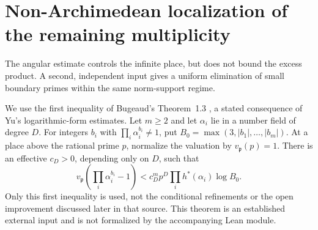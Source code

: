 \section{Non-Archimedean localization of the remaining multiplicity}
\label{sec:adic-moving}
The angular estimate controls the infinite place, but does not bound the excess product. A second, independent input gives a uniform elimination of small boundary primes within the same norm-support regime.

We use the first inequality of Bugeaud's Theorem~1.3 \cite{bugeaud}, a stated consequence of Yu's logarithmic-form estimates. Let $m\ge2$ and let $\alpha_i$ lie in a number field of degree $D$. For integers $b_i$ with $\prod_i\alpha_i^{b_i}\ne1$, put $B_0=\max(3,|b_1|,\ldots,|b_m|)$. At a place above the rational prime $p$, normalize the valuation by $v_{\mathfrak p}(p)=1$. There is an effective $c_D>0$, depending only on $D$, such that
\begin{equation}\label{eq:yu-input}
 v_{\mathfrak p}\left(\prod_i\alpha_i^{b_i}-1\right)
 <c_D^m p^D\prod_i h^*(\alpha_i)\log B_0.
\end{equation}
Only this first inequality is used, not the conditional refinements or the open improvement discussed later in that source. This theorem is an established external input and is not formalized by the accompanying Lean module.

